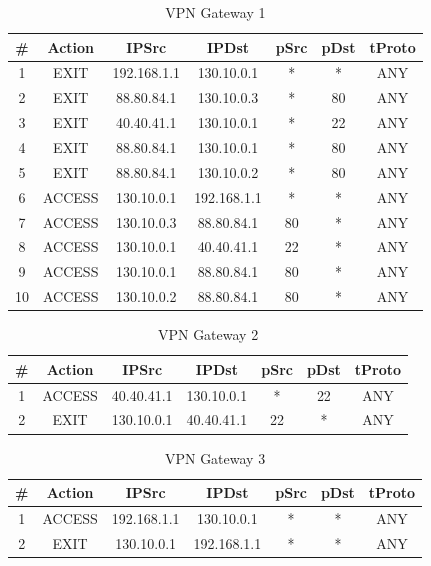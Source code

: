 \begin{table}[ht]
    \centering
    \begin{tabular}{ccccccc}
        \hline
         \# & Action & IPSrc & IPDst & pSrc & pDst & tProto \\
        \hline
        1 & EXIT & 192.168.1.1 & 130.10.0.1 & * & * & ANY \\
        2 & EXIT & 88.80.84.1 & 130.10.0.3 & * & 80 & ANY \\
        3 & EXIT & 40.40.41.1 & 130.10.0.1 & * & 22 & ANY \\
        4 & EXIT & 88.80.84.1 & 130.10.0.1 & * & 80 & ANY \\
        5 & EXIT & 88.80.84.1 & 130.10.0.2 & * & 80 & ANY \\
        6 & ACCESS & 130.10.0.1 & 192.168.1.1 & * & * & ANY \\
        7 & ACCESS & 130.10.0.3 & 88.80.84.1 & 80 & * & ANY \\
        8 & ACCESS & 130.10.0.1 & 40.40.41.1 & 22 & * & ANY \\
        9 & ACCESS & 130.10.0.1 & 88.80.84.1 & 80 & * & ANY \\
        10 & ACCESS & 130.10.0.2 & 88.80.84.1 & 80 & * & ANY\\
        \hline
    \end{tabular}
    \caption{VPN Gateway 1}
    \label{tab:VPN Gateway 1}
\end{table}

\begin{table}[ht]
    \centering
    \begin{tabular}{ccccccc}
        \hline
         \# & Action & IPSrc & IPDst & pSrc & pDst & tProto \\
        \hline
        1 & ACCESS & 40.40.41.1 & 130.10.0.1 & * & 22 & ANY \\
        2 & EXIT & 130.10.0.1 & 40.40.41.1 & 22 & * & ANY \\
        \hline
    \end{tabular}
    \caption{VPN Gateway 2}
    \label{tab:VPN Gateway 2}
\end{table}

\begin{table}[H]
    \centering
    \begin{tabular}{ccccccc}
        \hline
         \# & Action & IPSrc & IPDst & pSrc & pDst & tProto \\
        \hline
        1 & ACCESS & 192.168.1.1 & 130.10.0.1 & * & * & ANY \\
        2 & EXIT & 130.10.0.1 & 192.168.1.1 & * & * & ANY \\
        \hline
    \end{tabular}
    \caption{VPN Gateway 3}
    \label{tab:VPN Gateway 3}
\end{table}

